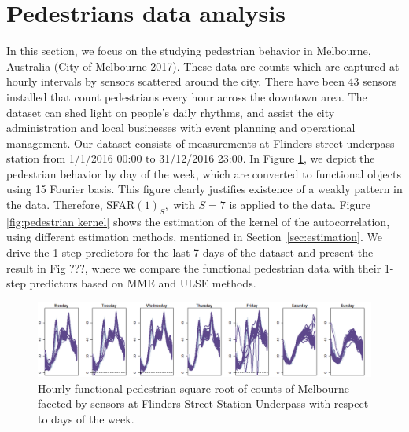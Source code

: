 \documentclass[11pt,a4paper]{article}
\numberwithin{equation}{section}
\begin{document}
\section{Pedestrians data analysis}\label{sec:real data}

In this section, we focus on the studying pedestrian behavior in Melbourne, Australia (City of Melbourne 2017). These data are counts which are captured at hourly intervals by sensors scattered around the city. There have been 43 sensors installed that count pedestrians every hour across the downtown area. The dataset can shed light on people's daily rhythms, and assist the city administration and local  businesses with event planning and operational management. Our dataset consists of measurements at Flinders street underpass station from 1/1/2016 00:00 to 31/12/2016 23:00. In Figure \ref{fig:pedestrian}, we depict the pedestrian behavior by day of the week, which are converted to functional objects using 15 Fourier basis. This figure clearly justifies existence of a weakly pattern in the data.  Therefore, SFAR$\left(1\right)_S,$ with $S=7$ is applied to the data. Figure        \ref{fig:pedestrian kernel} shows the estimation of the kernel of the autocorrelation, using different estimation methods, mentioned in Section~\ref{sec:estimation}. 
We drive the 1-step predictors for the last 7 days of the dataset and present the result in Fig ???, where we
 compare the functional pedestrian data with their 1-step predictors based on MME and ULSE methods.

\begin{figure}
\centering
\includegraphics[width=\textwidth]{images/Flinders.png}
\caption{
Hourly functional pedestrian square root of counts of Melbourne faceted by sensors at Flinders Street Station Underpass with respect to days of the week.
\label{fig:pedestrian}}
\end{figure}
\end{document}
